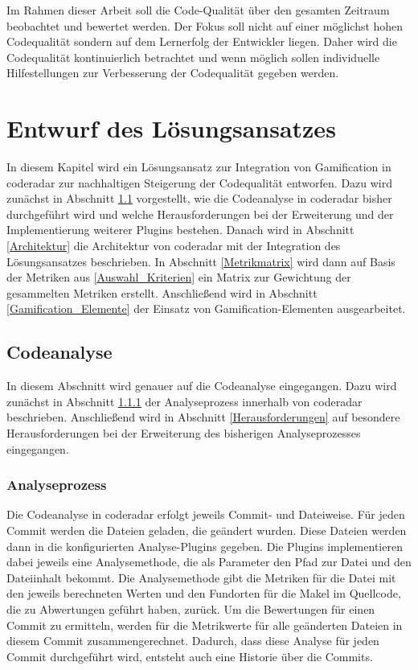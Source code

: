 \documentclass[
	oneside,  %
	ngerman, 
	final, 
	11pt, 
	a4paper, 
	1.1headlines, 
	headinclude=false, 
	footinclude=false, 
	mpinclude=false, 
	pagesize, 
	onecolumn, 
	titlepage, 
	parskip=half, 
	headsepline, 
	chapterprefix=false, 
	version=first, 
	listof=totoc, 
	bibliography=totoc, 
	toc=graduated, 
	fleqn
]{scrbook}
\begin{document}
Im Rahmen dieser Arbeit soll die Code-Qualität über den gesamten Zeitraum beobachtet und bewertet werden.
Der Fokus soll nicht auf einer möglichst hohen Codequalität sondern auf dem Lernerfolg der Entwickler liegen.
Daher wird die Codequalität kontinuierlich betrachtet und wenn möglich sollen individuelle Hilfestellungen zur Verbesserung der Codequalität gegeben werden.

\chapter{Entwurf des Lösungsansatzes}
\label{Entwurf}
In diesem Kapitel wird ein Lösungsansatz zur Integration von Gamification in coderadar zur nachhaltigen Steigerung der Codequalität entworfen.
Dazu wird zunächst in Abschnitt \ref{Codeanalyse} vorgestellt, wie die Codeanalyse in coderadar bisher durchgeführt wird und welche Herausforderungen bei der Erweiterung und der Implementierung weiterer Plugins bestehen.
Danach wird in Abschnitt \ref{Architektur} die Architektur von coderadar mit der Integration des Lösungsansatzes beschrieben.
In Abschnitt \ref{Metrikmatrix} wird dann auf Basis der Metriken aus \ref{Auswahl_Kriterien} ein Matrix zur Gewichtung der gesammelten Metriken erstellt.
Anschließend wird in Abschnitt \ref{Gamification_Elemente} der Einsatz von Gamification-Elementen ausgearbeitet.

\section{Codeanalyse}
\label{Codeanalyse}
In diesem Abschnitt wird genauer auf die Codeanalyse eingegangen.
Dazu wird zunächst in Abschnitt \ref{Analyseprozess} der Analyseprozess innerhalb von coderadar beschrieben.
Anschließend wird in Abschnitt \ref{Herausforderungen} auf besondere Herausforderungen bei der Erweiterung des bisherigen Analyseprozesses eingegangen.

\subsection{Analyseprozess}
\label{Analyseprozess}
Die Codeanalyse in coderadar erfolgt jeweils Commit- und Dateiweise.
Für jeden Commit werden die Dateien geladen, die geändert wurden.
Diese Dateien werden dann in die konfigurierten Analyse-Plugins gegeben.
Die Plugins implementieren dabei jeweils eine Analysemethode, die als Parameter den Pfad zur Datei und den Dateiinhalt bekommt.
Die Analysemethode gibt die Metriken für die Datei mit den jeweils berechneten Werten und den Fundorten für die Makel im Quellcode, die zu Abwertungen geführt haben, zurück.
Um die Bewertungen für einen Commit zu ermitteln, werden für die Metrikwerte für alle geänderten Dateien in diesem Commit zusammengerechnet.
Dadurch, dass diese Analyse für jeden Commit durchgeführt wird, entsteht auch eine Historie über die Commits.
\end{document}
